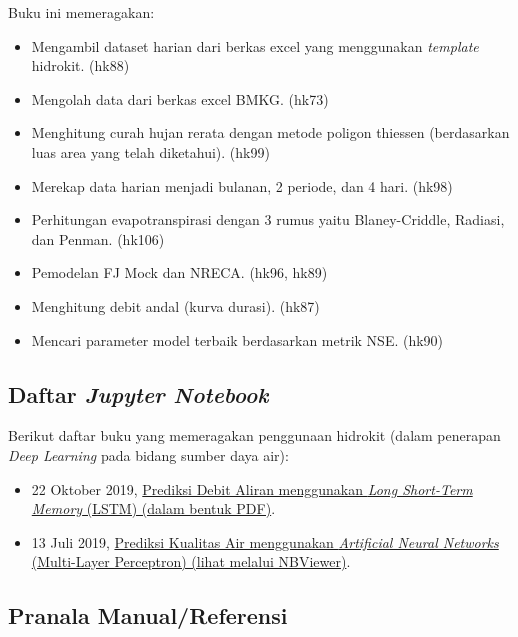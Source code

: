 \documentclass[11pt]{article}
\providecommand{\tightlist}{%
      \setlength{\itemsep}{0pt}\setlength{\parskip}{0pt}}
\begin{document}
Buku ini memeragakan:

\begin{itemize}
\tightlist
\item
  Mengambil dataset harian dari berkas excel yang menggunakan
  \emph{template} hidrokit. (hk88)
\item
  Mengolah data dari berkas excel BMKG. (hk73)
\item
  Menghitung curah hujan rerata dengan metode poligon thiessen
  (berdasarkan luas area yang telah diketahui). (hk99)
\item
  Merekap data harian menjadi bulanan, 2 periode, dan 4 hari. (hk98)
\item
  Perhitungan evapotranspirasi dengan 3 rumus yaitu Blaney-Criddle,
  Radiasi, dan Penman. (hk106)
\item
  Pemodelan FJ Mock dan NRECA. (hk96, hk89)
\item
  Menghitung debit andal (kurva durasi). (hk87)
\item
  Mencari parameter model terbaik berdasarkan metrik NSE. (hk90)
\end{itemize}

\hypertarget{daftar-jupyter-notebook}{%
\subsection{\texorpdfstring{Daftar \emph{Jupyter
Notebook}}{Daftar Jupyter Notebook}}\label{daftar-jupyter-notebook}}

Berikut daftar buku yang memeragakan penggunaan hidrokit (dalam
penerapan \emph{Deep Learning} pada bidang sumber daya air):

\begin{itemize}
\tightlist
\item
  22 Oktober 2019,
  \href{https://github.com/taruma/vivaldi/blob/master/pdf/taruma_lstm_rr_laporan.pdf?raw=true}{Prediksi
  Debit Aliran menggunakan \emph{Long Short-Term Memory} (LSTM) (dalam
  bentuk PDF)}.
\item
  13 Juli 2019,
  \href{https://nbviewer.jupyter.org/github/taruma/hidrokit-nb/blob/master/notebook/taruma_demo_ann_ka_2_0_0.ipynb}{Prediksi
  Kualitas Air menggunakan \emph{Artificial Neural Networks}
  (Multi-Layer Perceptron) (lihat melalui NBViewer)}.
\end{itemize}

\hypertarget{pranala-manualreferensi}{%
\subsection{Pranala Manual/Referensi}\label{pranala-manualreferensi}}
\end{document}
